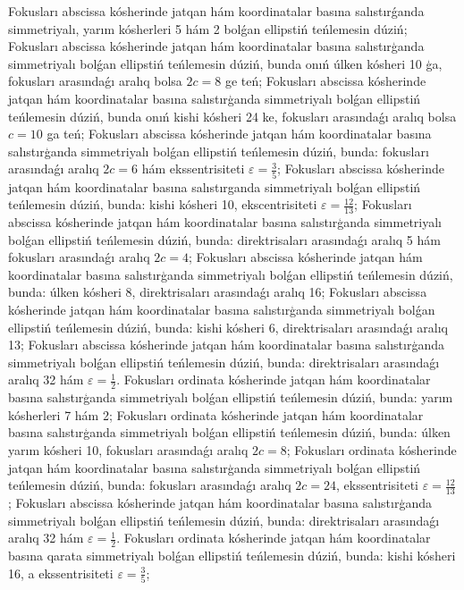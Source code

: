 Fokusları abscissa kósherinde jatqan hám koordinatalar basına salıstırǵanda simmetriyalı, yarım kósherleri 5 hám 2 bolǵan ellipstiń teńlemesin dúziń;
Fokusları abscissa kósherinde jatqan hám koordinatalar basına salıstırģanda simmetriyalı bolǵan ellipstiń teńlemesin dúziń, bunda onıń úlken kósheri 10 ģa, fokusları arasındaǵı aralıq bolsa $2c = 8$ ge teń;
Fokusları abscissa kósherinde jatqan hám koordinatalar basına salıstırģanda simmetriyalı bolǵan ellipstiń teńlemesin dúziń, bunda onıń kishi kósheri 24 ke, fokusları arasındaǵı aralıq bolsa $c = 10$ ga teń;
Fokusları abscissa kósherinde jatqan hám koordinatalar basına salıstırģanda simmetriyalı bolǵan ellipstiń teńlemesin dúziń, bunda: fokusları arasındaǵı aralıq $2 c=6$ hám ekssentrisiteti $\varepsilon=\frac{3}{5}$;
Fokusları abscissa kósherinde jatqan hám koordinatalar basına salıstırganda simmetriyalı bolǵan ellipstiń teńlemesin dúziń, bunda: kishi kósheri 10, ekscentrisiteti $\varepsilon=\frac{12}{13}$;
Fokusları abscissa kósherinde jatqan hám koordinatalar basına salıstırģanda simmetriyalı bolǵan ellipstiń teńlemesin dúziń, bunda: direktrisaları arasındaǵı aralıq 5 hám fokusları arasındaǵı aralıq $2c=4$;
Fokusları abscissa kósherinde jatqan hám koordinatalar basına salıstırģanda simmetriyalı bolǵan ellipstiń teńlemesin dúziń, bunda: úlken kósheri 8, direktrisaları arasındaǵı aralıq 16;
Fokusları abscissa kósherinde jatqan hám koordinatalar basına salıstırģanda simmetriyalı bolǵan ellipstiń teńlemesin dúziń, bunda: kishi kósheri 6, direktrisaları arasındaǵı aralıq 13;
Fokusları abscissa kósherinde jatqan hám koordinatalar basına salıstırģanda simmetriyalı bolǵan ellipstiń teńlemesin dúziń, bunda: direktrisaları arasındaǵı aralıq 32 hám $\varepsilon=\frac{1}{2}$.
Fokusları ordinata kósherinde jatqan hám koordinatalar basına salıstırģanda simmetriyalı bolǵan ellipstiń teńlemesin dúziń, bunda: yarım kósherleri 7 hám 2;
Fokusları ordinata kósherinde jatqan hám koordinatalar basına salıstırģanda simmetriyalı bolǵan ellipstiń teńlemesin dúziń, bunda: úlken yarım kósheri 10, fokusları arasındaǵı aralıq $2 c=8$;
Fokusları ordinata kósherinde jatqan hám koordinatalar basına salıstırģanda simmetriyalı bolǵan ellipstiń teńlemesin dúziń, bunda: fokusları arasındaǵı aralıq $2 c=24$, ekssentrisiteti $\varepsilon=\frac{12}{13}$;
Fokusları abscissa kósherinde jatqan hám koordinatalar basına salıstırģanda simmetriyalı bolǵan ellipstiń teńlemesin dúziń, bunda: direktrisaları arasındaǵı aralıq 32 hám $\varepsilon=\frac{1}{2}$.
Fokusları ordinata kósherinde jatqan hám koordinatalar basına qarata simmetriyalı bolǵan ellipstiń teńlemesin dúziń, bunda: kishi kósheri 16, a ekssentrisiteti $\varepsilon=\frac{3}{5}$;

